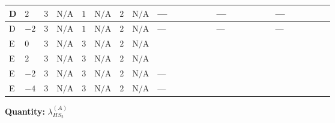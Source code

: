 \documentclass[8pt]{article}
\begin{document}
\begin{landscape}
\begin{longtable}{@{}llcccccc >{\raggedright\arraybackslash}p{0.21\linewidth} >{\raggedright\arraybackslash}p{0.21\linewidth} >{\raggedright\arraybackslash}p{0.21\linewidth}@{}}
\midrule
D & $2$ & $3$ & $\text{N/A}$ & $1$ & $\text{N/A}$ & $2$ & $\text{N/A}$ & --- & --- & --- \\
\midrule
D & $-2$ & $3$ & $\text{N/A}$ & $1$ & $\text{N/A}$ & $2$ & $\text{N/A}$ & --- & --- & --- \\
\midrule
E & $0$ & $3$ & $\text{N/A}$ & $3$ & $\text{N/A}$ & $2$ & $\text{N/A}$ & \scriptsize\adjustbox{max width=\linewidth}{$\begin{gathered} +{g_1}^2 \left(4 {g_2}^2-\frac{15 {\lambda_{HS_2}^{(A)}}}{2}\right)\end{gathered}$} & \scriptsize\adjustbox{max width=\linewidth}{$\begin{gathered} -\frac{33 {g_2}^2 {\lambda_{HS_2}^{(A)}}}{2}\end{gathered}$} & \scriptsize\adjustbox{max width=\linewidth}{$\begin{gathered} +2 {\lambda_1} {\lambda_{HS_2}^{(A)}}\end{gathered}$} \\
\midrule
E & $2$ & $3$ & $\text{N/A}$ & $3$ & $\text{N/A}$ & $2$ & $\text{N/A}$ & \scriptsize\adjustbox{max width=\linewidth}{$\begin{gathered} +{g_1}^2 \left(8 {g_2}^2-\frac{51 {\lambda_{HS_2}^{(A)}}}{2}\right)\end{gathered}$} & \scriptsize\adjustbox{max width=\linewidth}{$\begin{gathered} -\frac{33 {g_2}^2 {\lambda_{HS_2}^{(A)}}}{2}\end{gathered}$} & \scriptsize\adjustbox{max width=\linewidth}{$\begin{gathered} +2 {\lambda_1} {\lambda_{HS_2}^{(A)}}\end{gathered}$} \\
\midrule
E & $-2$ & $3$ & $\text{N/A}$ & $3$ & $\text{N/A}$ & $2$ & $\text{N/A}$ & --- & \scriptsize\adjustbox{max width=\linewidth}{$\begin{gathered} -\frac{33 {g_2}^2 {\lambda_{HS_2}^{(A)}}}{2}\end{gathered}$} & \scriptsize\adjustbox{max width=\linewidth}{$\begin{gathered} +2 {\lambda_1} {\lambda_{HS_2}^{(A)}}\end{gathered}$} \\
\midrule
E & $-4$ & $3$ & $\text{N/A}$ & $3$ & $\text{N/A}$ & $2$ & $\text{N/A}$ & --- & \scriptsize\adjustbox{max width=\linewidth}{$\begin{gathered} -\frac{33 {g_2}^2 {\lambda_{HS_2}^{(A)}}}{2}\end{gathered}$} & \scriptsize\adjustbox{max width=\linewidth}{$\begin{gathered} +2 {\lambda_1} {\lambda_{HS_2}^{(A)}}\end{gathered}$} \\
\midrule
\bottomrule
\end{longtable}
\clearpage
\noindent\textbf{Quantity: }$\lambda_{HS_2}^{(A)}$\par\smallskip

\end{landscape}
\end{document}
